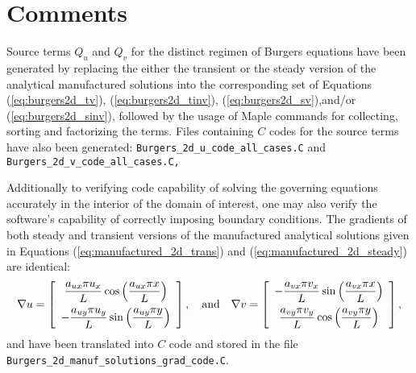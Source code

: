 \documentclass[10pt]{article}
\begin{document}
\section{Comments}

Source terms $Q_u$ and $Q_v$ for the distinct regimen of Burgers equations have been generated by replacing the either the transient or the steady version of the analytical  manufactured solutions into the corresponding set of Equations (\ref{eq:burgers2d_tv}), (\ref{eq:burgers2d_tinv}), (\ref{eq:burgers2d_sv}),and/or (\ref{eq:burgers2d_sinv}), followed by the usage of Maple \citep{Maple15} commands for collecting, sorting and factorizing the terms. Files containing $C$ codes for the source terms have also been generated:  \texttt{Burgers\_2d\_u\_code\_all\_cases.C} and \texttt{Burgers\_2d\_v\_code\_all\_cases.C,}

Additionally to verifying code capability of solving the governing equations accurately in the interior of the domain of interest, one may also verify the software's capability of correctly imposing boundary conditions. The gradients of both steady and transient versions of the manufactured analytical solutions given in Equations (\ref{eq:manufactured_2d_trans}) and (\ref{eq:manufactured_2d_steady}) are identical:
\begin{equation*}
\nabla u = \left[ \begin{array}{c}
  \dfrac{  a_{ux}  \pi u_x}{L} \cos\left( \dfrac{ a_{ux}  \pi  x}{L}\right)\vspace{5pt}\\
 -   \dfrac{  a_{uy}  \pi u_y}{L} \sin\left( \dfrac{ a_{uy}  \pi  y}{L}\right)
\end{array} \right],
\quad\mbox{and}\quad
\nabla  v= \left[ \begin{array}{c}
-  \dfrac{  a_{vx}  \pi v_x}{L}  \sin\left( \dfrac{ a_{vx}  \pi  x}{L}\right)\vspace{5pt}\\
    \dfrac{  a_{vy}  \pi v_y}{L} \cos\left( \dfrac{ a_{vy}  \pi  y}{L}\right)
\end{array} \right],
\end{equation*}
and have been translated into  $C$ code  and stored in the file \texttt{Burgers\_2d\_manuf\_solutions\_grad\_code.C}.
\end{document}
